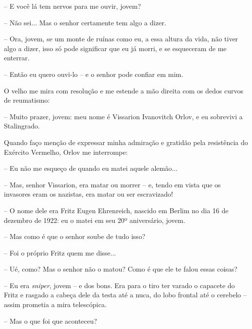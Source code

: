 -- E você lá tem nervos para me ouvir, jovem?

-- Não sei... Mas o senhor certamente tem algo a dizer.

-- Ora, jovem, se um monte de ruínas como eu, a essa altura da vida, não
tiver algo a dizer, isso só pode significar que eu já morri, e se
esqueceram de me enterrar.

-- Então eu quero ouvi-lo -- e o senhor pode confiar em mim.

O velho me mira com resolução e me estende a mão direita com os dedos
curvos de reumatismo:

-- Muito prazer, jovem: meu nome é Vissarion Ivanovitch Orlov, e eu
sobrevivi a Stalingrado.

Quando faço menção de expressar minha admiração e gratidão pela
resistência do Exército Vermelho, Orlov me interrompe:

-- Eu não me esqueço de quando eu matei aquele alemão...

-- Mas, senhor Vissarion, era matar ou morrer -- e, tendo em vista que
os invasores eram os nazistas, era matar ou ser escravizado!

-- O nome dele era Fritz Eugen Ehrenreich, nascido em Berlim no dia 16
de dezembro de 1922: eu o matei em seu 20º aniversário, jovem.

-- Mas como é que o senhor soube de tudo isso?

-- Foi o próprio Fritz quem me disse...

-- Ué, como? Mas o senhor não o matou? Como é que ele te falou essas
coisas?

-- Eu era \emph{sniper}, jovem -- e dos bons. Era para o tiro ter varado
o capacete do Fritz e rasgado a cabeça dele da testa até a nuca, do lobo
frontal até o cerebelo -- assim prometia a mira telescópica.

-- Mas o que foi que aconteceu?


